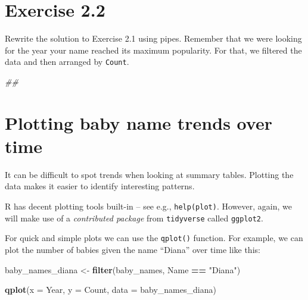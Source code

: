 \documentclass[]{book}
\newenvironment{Shaded}{\begin{snugshade}}{\end{snugshade}}
\newcommand{\CommentTok}[1]{\textcolor[rgb]{0.56,0.35,0.01}{\textit{#1}}}
\newcommand{\DataTypeTok}[1]{\textcolor[rgb]{0.13,0.29,0.53}{#1}}
\newcommand{\KeywordTok}[1]{\textcolor[rgb]{0.13,0.29,0.53}{\textbf{#1}}}
\newcommand{\NormalTok}[1]{#1}
\newcommand{\OperatorTok}[1]{\textcolor[rgb]{0.81,0.36,0.00}{\textbf{#1}}}
\newcommand{\StringTok}[1]{\textcolor[rgb]{0.31,0.60,0.02}{#1}}
\begin{document}
\hypertarget{exercise-2.2}{%
\section{Exercise 2.2}\label{exercise-2.2}}

Rewrite the solution to Exercise 2.1 using pipes. Remember that we were looking
for the year your name reached its maximum popularity. For that, we filtered
the data and then arranged by \texttt{Count}.

\begin{Shaded}
\begin{Highlighting}[]
\CommentTok{##}
\end{Highlighting}
\end{Shaded}

\hypertarget{plotting-baby-name-trends-over-time}{%
\section{Plotting baby name trends over time}\label{plotting-baby-name-trends-over-time}}

It can be difficult to spot trends when looking at summary tables.
Plotting the data makes it easier to identify interesting patterns.

R has decent plotting tools built-in -- see e.g., \texttt{help(plot)}.
However, again, we will make use of a \emph{contributed
package} from \texttt{tidyverse} called \texttt{ggplot2}.

For quick and simple plots we can use the \texttt{qplot()} function. For example,
we can plot the number of babies given the name ``Diana'' over time like this:

\begin{Shaded}
\begin{Highlighting}[]
\NormalTok{baby_names_diana <-}\StringTok{ }\KeywordTok{filter}\NormalTok{(baby_names, Name }\OperatorTok{==}\StringTok{ "Diana"}\NormalTok{)}
\end{Highlighting}
\end{Shaded}

\begin{Shaded}
\begin{Highlighting}[]
\KeywordTok{qplot}\NormalTok{(}\DataTypeTok{x =}\NormalTok{ Year, }\DataTypeTok{y =}\NormalTok{ Count,}
     \DataTypeTok{data =}\NormalTok{ baby_names_diana)}
\end{Highlighting}
\end{Shaded}
\end{document}
